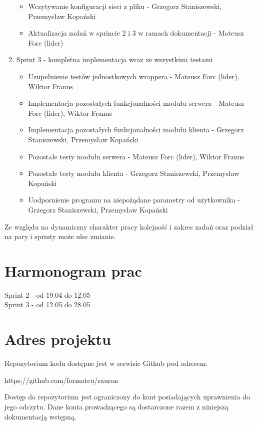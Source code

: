 \documentclass[a4paper,11pt]{article}
\begin{document}
\begin{enumerate}
\begin{itemize}
\item Wczytywanie konfiguracji sieci z pliku - Grzegorz Staniszewski, Przemysław Kopański
\item Aktualizacja zadań w sprincie 2 i 3 w ramach dokumentacji - Mateusz Forc (lider)
\end{itemize}
\item Sprint 3 - kompletna implementacja wraz ze wszystkimi testami
\begin{itemize}
\item Uzupełnienie testów jednostkowych wrappera - Mateusz Forc (lider), Wiktor Franus
\item Implementacja pozostałych funkcjonalności modułu serwera - Mateusz Forc (lider), Wiktor Franus
\item Implementacja pozostałych funkcjonalności modułu klienta - Grzegorz Staniszewski, Przemysław Kopański
\item Pozostałe testy modułu serwera - Mateusz Forc (lider), Wiktor Franus
\item Pozostałe testy modułu klienta - Grzegorz Staniszewski, Przemysław Kopański
\item Uodpornienie programu na niepożądane parametry od użytkownika - Grzegorz Staniszewski, Przemysław Kopański
\end{itemize}
\end{enumerate}
Ze względu na dynamiczny charakter pracy kolejność i zakres zadań oraz podział na pary i sprinty może ulec zmianie. 

\section{Harmonogram prac}
Sprint 2 - od 19.04 do 12.05 \\
Sprint 3 - od 12.05 do 28.05 \\

\section{Adres projektu}
Repozytorium kodu dostępne jest w serwisie Github pod adresem:
\begin{center}https://github.com/formateu/sauron \end{center}
Dostęp do repozytorium jest ograniczony do kont posiadających uprawnienia do jego odczytu. Dane konta prowadzącego są dostarczone razem z niniejszą dokumentacją wstępną.
\end{document}
